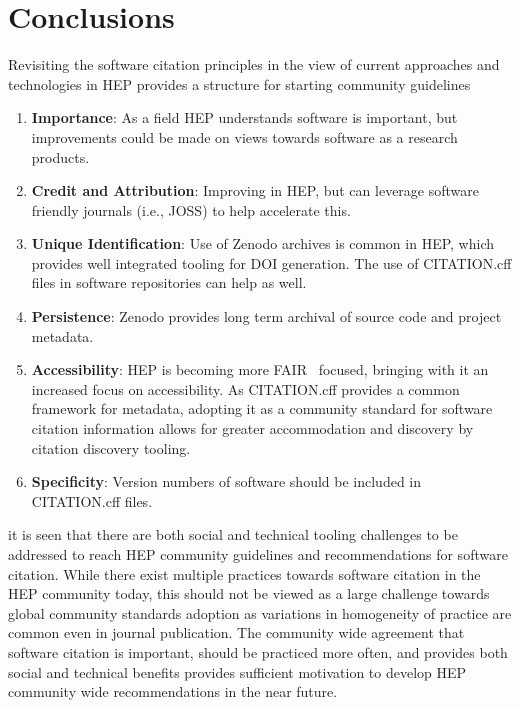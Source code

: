 \section{Conclusions}\label{sec:conclusions}

Revisiting the software citation principles in the view of current approaches and technologies in HEP provides a structure for starting community guidelines

\begin{enumerate}
    \item \textbf{Importance}: As a field HEP understands software is important, but improvements could be made on views towards software as a research products.
    \item \textbf{Credit and Attribution}: Improving in HEP, but can leverage software friendly journals (i.e., JOSS) to help accelerate this.
    \item \textbf{Unique Identification}: Use of Zenodo archives is common in HEP, which provides well integrated tooling for DOI generation.
The use of CITATION.cff files in software repositories can help as well.
    \item \textbf{Persistence}: Zenodo provides long term archival of source code and project metadata.
    \item \textbf{Accessibility}: HEP is becoming more FAIR~\cite{FAIR-paper} focused, bringing with it an increased focus on accessibility.
As CITATION.cff provides a common framework for metadata, adopting it as a community standard for software citation information allows for greater accommodation and discovery by citation discovery tooling.
    \item \textbf{Specificity}: Version numbers of software should be included in CITATION.cff files.
\end{enumerate}

it is seen that there are both social and technical tooling challenges to be addressed to reach HEP community guidelines and recommendations for software citation.
While there exist multiple practices towards software citation in the HEP community today, this should not be viewed as a large challenge towards global community standards adoption as variations in homogeneity of practice are common even in journal publication.
The community wide agreement that software citation is important, should be practiced more often, and provides both social and technical benefits provides sufficient motivation to develop HEP community wide recommendations in the near future.
